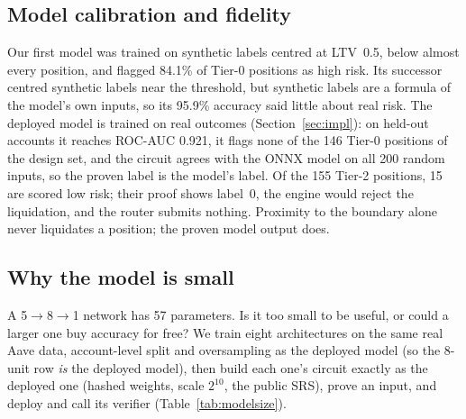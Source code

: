 \documentclass[sigconf,nonacm]{acmart}
\begin{document}


\subsection{Model calibration and fidelity}

Our first model was trained on synthetic labels centred at LTV~0.5, below almost every position, and flagged 84.1\% of Tier-0 positions as high risk. Its successor centred synthetic labels near the threshold, but synthetic labels are a formula of the model's own inputs, so its 95.9\% accuracy said little about real risk. The deployed model is trained on real outcomes (Section~\ref{sec:impl}): on held-out accounts it reaches ROC-AUC 0.921, it flags none of the 146 Tier-0 positions of the design set, and the circuit agrees with the ONNX model on all 200 random inputs, so the proven label is the model's label. Of the 155 Tier-2 positions, 15 are scored low risk; their proof shows label~0, the engine would reject the liquidation, and the router submits nothing. Proximity to the boundary alone never liquidates a position; the proven model output does.

\subsection{Why the model is small}
\label{sec:eval-modelsize}

A 5$\to$8$\to$1 network has 57 parameters. Is it too small to be useful, or could a larger one buy accuracy for free? We train eight architectures on the same real Aave data, account-level split and oversampling as the deployed model (so the 8-unit row \emph{is} the deployed model), then build each one's circuit exactly as the deployed one (hashed weights, scale $2^{10}$, the public SRS), prove an input, and deploy and call its verifier (Table~\ref{tab:modelsize}).
\end{document}
